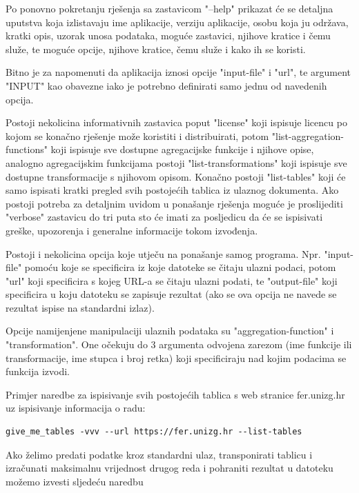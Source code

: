 \documentclass[times, utf8, zavrsni]{fer}
\begin{document}
Po ponovno pokretanju rješenja sa zastavicom "--help" prikazat će se detaljna
uputstva koja izlistavaju ime aplikacije, verziju aplikacije, osobu koja ju
održava, kratki opis, uzorak unosa podataka, moguće zastavici, njihove kratice
i čemu služe, te moguće opcije, njihove kratice, čemu služe i kako ih se
koristi.

Bitno je za napomenuti da aplikacija iznosi opcije "input-file" i "url", te
argument "INPUT" kao obavezne iako je potrebno definirati samo jednu od
navedenih opcija.

Postoji nekolicina informativnih zastavica poput "license" koji ispisuje
licencu po kojom se konačno rješenje može koristiti i distribuirati, potom
"list-aggregation-functions" koji
ispisuje sve dostupne agregacijske funkcije i njihove opise, analogno
agregacijskim funkcijama postoji "list-transformations" koji ispisuje sve
dostupne transformacije s njihovom opisom. Konačno postoji "list-tables"
koji će samo ispisati kratki pregled svih postojećih tablica iz ulaznog
dokumenta. Ako postoji potreba za detaljnim uvidom u ponašanje rješenja moguće
je proslijediti "verbose" zastavicu do tri puta sto će imati za posljedicu da
će se ispisivati greške, upozorenja i generalne informacije tokom izvođenja.

Postoji i nekolicina opcija koje utječu na ponašanje samog programa. Npr.
"input-file" pomoću koje se specificira iz koje datoteke se čitaju ulazni
podaci, potom "url" koji specificira s kojeg URL-a se čitaju ulazni podati, te
"output-file" koji specificira u koju datoteku se zapisuje rezultat (ako se ova
opcija ne navede se rezultat ispise na standardni izlaz).

Opcije namijenjene manipulaciji ulaznih podataka su "aggregation-function" i
"transformation". One očekuju do 3 argumenta odvojena zarezom (ime funkcije ili
transformacije, ime stupca i broj retka) koji specificiraju nad kojim podacima
se funkcija izvodi.

Primjer naredbe za ispisivanje svih postojećih tablica s web stranice
fer.unizg.hr uz ispisivanje informacija o radu:

\begin{lstlisting}
give_me_tables -vvv --url https://fer.unizg.hr --list-tables
\end{lstlisting}

Ako želimo predati podatke kroz standardni ulaz, transponirati tablicu i
izračunati maksimalnu vrijednost drugog reda i pohraniti rezultat u datoteku
možemo izvesti sljedeću naredbu
\end{document}
